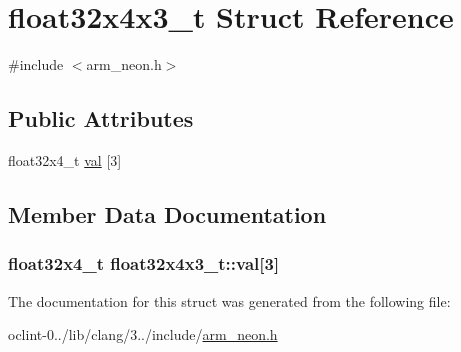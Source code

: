 \hypertarget{structfloat32x4x3__t}{\section{float32x4x3\-\_\-t Struct Reference}
\label{structfloat32x4x3__t}
}


{\ttfamily \#include $<$arm\-\_\-neon.\-h$>$}

\subsection*{Public Attributes}
\begin{DoxyCompactItemize}
\item 
float32x4\-\_\-t \hyperlink{structfloat32x4x3__t_a6a95ef03f0fe069f3200520547c0ca68}{val} \mbox{[}3\mbox{]}
\end{DoxyCompactItemize}


\subsection{Member Data Documentation}
\hypertarget{structfloat32x4x3__t_a6a95ef03f0fe069f3200520547c0ca68}{
\subsubsection[{val}]{\setlength{\rightskip}{0pt plus 5cm}float32x4\-\_\-t float32x4x3\-\_\-t\-::val\mbox{[}3\mbox{]}}}\label{structfloat32x4x3__t_a6a95ef03f0fe069f3200520547c0ca68}


The documentation for this struct was generated from the following file\-:\begin{DoxyCompactItemize}
\item 
oclint-\/0../lib/clang/3../include/\hyperlink{arm__neon_8h}{arm\-\_\-neon.\-h}\end{DoxyCompactItemize}
